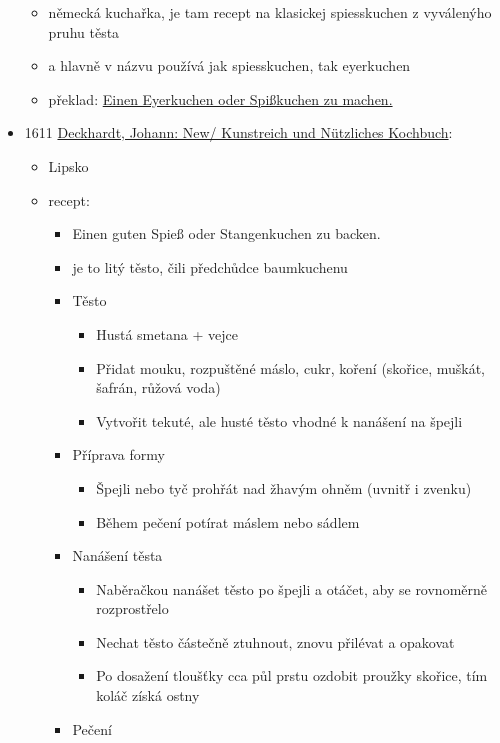\begin{itemize}
  \begin{itemize}
  \tightlist
  \item
    německá kuchařka, je tam recept na klasickej spiesskuchen z
    vyválenýho pruhu těsta
  \item
    a hlavně v názvu používá jak spiesskuchen, tak eyerkuchen
  \item
    překlad: \hyperref[250605-2334]{Einen Eyerkuchen oder Spißkuchen zu
    machen.}
  \end{itemize}
\item
  1611
  \href{https://www.deutschestextarchiv.de/book/view/deckhardt_kochbuch_1611/?p=264&hl=Spie\%C3\%9Fkuchen}{Deckhardt,
  Johann: New/ Kunstreich und Nützliches Kochbuch}:

  \begin{itemize}
  \tightlist
  \item
    Lipsko
  \item
    recept:

    \begin{itemize}
    \tightlist
    \item
      Einen guten Spieß oder Stangenkuchen zu backen.
    \item
      je to litý těsto, čili předchůdce baumkuchenu
    \item
      Těsto

      \begin{itemize}
      \tightlist
      \item
        Hustá smetana + vejce
      \item
        Přidat mouku, rozpuštěné máslo, cukr, koření (skořice, muškát,
        šafrán, růžová voda)
      \item
        Vytvořit tekuté, ale husté těsto vhodné k nanášení na špejli
      \end{itemize}
    \item
      Příprava formy

      \begin{itemize}
      \tightlist
      \item
        Špejli nebo tyč prohřát nad žhavým ohněm (uvnitř i zvenku)
      \item
        Během pečení potírat máslem nebo sádlem
      \end{itemize}
    \item
      Nanášení těsta

      \begin{itemize}
      \tightlist
      \item
        Naběračkou nanášet těsto po špejli a otáčet, aby se rovnoměrně
        rozprostřelo
      \item
        Nechat těsto částečně ztuhnout, znovu přilévat a opakovat
      \item
        Po dosažení tloušťky cca půl prstu ozdobit proužky skořice, tím
        koláč získá ostny
      \end{itemize}
    \item
      Pečení


\end{itemize}
\end{itemize}
\end{itemize}
